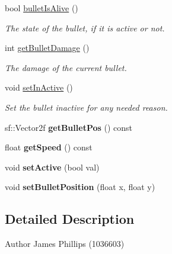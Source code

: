 \begin{DoxyCompactItemize}
bool \hyperlink{class_bullet_a103ff9146dce215f15ca0c4282a5a8cf}{bullet\+Is\+Alive} ()
\begin{DoxyCompactList}\small\item\em The state of the bullet, if it is active or not. \end{DoxyCompactList}\item 
\mbox{\label{class_bullet_a588467f138b5c65d018bf04ab2ca2931}} 
int \hyperlink{class_bullet_a588467f138b5c65d018bf04ab2ca2931}{get\+Bullet\+Damage} ()
\begin{DoxyCompactList}\small\item\em The damage of the current bullet. \end{DoxyCompactList}\item 
\mbox{\label{class_bullet_afe143dafb173b03b6f35fa9472cbe465}} 
void \hyperlink{class_bullet_afe143dafb173b03b6f35fa9472cbe465}{set\+In\+Active} ()
\begin{DoxyCompactList}\small\item\em Set the bullet inactive for any needed reason. \end{DoxyCompactList}\item 
\mbox{\label{class_bullet_a22bc1ccf27f5ff8fe939616ca10b1489}} 
sf\+::\+Vector2f {\bfseries get\+Bullet\+Pos} () const
\item 
\mbox{\label{class_bullet_ac1d1af57b11dae435ca8d951e85b7079}} 
float {\bfseries get\+Speed} () const
\item 
\mbox{\label{class_bullet_adfd1d1a317bd18f9d6aec65630301ae2}} 
void {\bfseries set\+Active} (bool val)
\item 
\mbox{\label{class_bullet_af6e316869e595d8f0b2af44dd80a8dd6}} 
void {\bfseries set\+Bullet\+Position} (float x, float y)
\end{DoxyCompactItemize}


\subsection{Detailed Description}
\begin{DoxyAuthor}{Author}
James Phillips (1036603) 
\end{DoxyAuthor}


